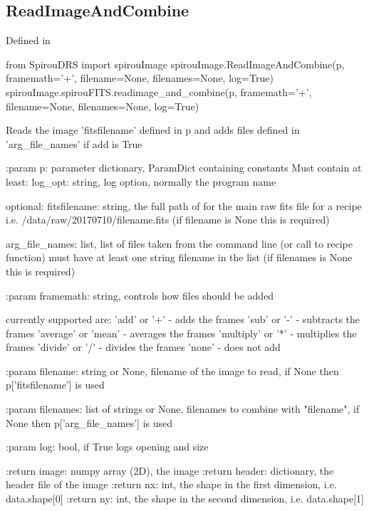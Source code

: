 \noindent\begin{minipage}{\textwidth}
\subsection{ReadImageAndCombine}

Defined in \spirouImage{}

\begin{pythonbox}
from SpirouDRS import spirouImage
spirouImage.ReadImageAndCombine(p, framemath='+', filename=None, filenames=None, log=True)
spirouImage.spirouFITS.readimage_and_combine(p, framemath='+', filename=None, filenames=None, log=True)
\end{pythonbox}

\begin{pythondocstring}
Reads the image 'fitsfilename' defined in p and adds files defined in
'arg_file_names' if add is True

:param p: parameter dictionary, ParamDict containing constants
    Must contain at least:
            log_opt: string, log option, normally the program name
            
            optional:
            fitsfilename: string, the full path of for the main raw fits
                  file for a recipe i.e. /data/raw/20170710/filename.fits
                  (if filename is None this is required)
                  
            arg_file_names: list, list of files taken from the command line
                            (or call to recipe function) must have at least
                            one string filename in the list
                  (if filenames is None this is required)

:param framemath: string, controls how files should be added

            currently supported are:
            'add' or '+'           - adds the frames
            'sub' or '-'           - subtracts the frames
            'average' or 'mean'    - averages the frames
            'multiply' or '*'      - multiplies the frames
            'divide' or '/'        - divides the frames
            'none'                 - does not add
            
:param filename: string or None, filename of the image to read, if None
                 then p['fitsfilename'] is used

:param filenames: list of strings or None, filenames to combine with 
                  "filename", if None then p['arg_file_names'] is used

:param log: bool, if True logs opening and size

:return image: numpy array (2D), the image
:return header: dictionary, the header file of the image
:return nx: int, the shape in the first dimension, i.e. data.shape[0]
:return ny: int, the shape in the second dimension, i.e. data.shape[1]
\end{pythondocstring}
\end{minipage}

